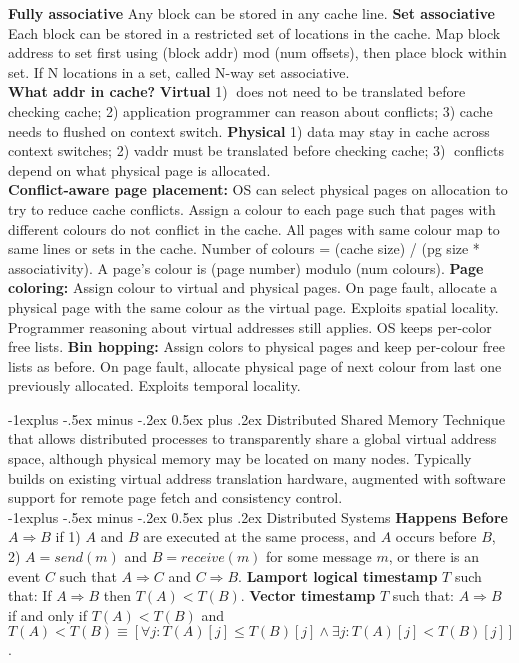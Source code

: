 \documentclass[9pt,landscape]{article}
\makeatletter
\renewcommand{\subsection}{\@startsection{subsection}{2}{0mm}%
                                {-1explus -.5ex minus -.2ex}%
                                {0.5ex plus .2ex}%
                                {\normalfont\normalsize\bfseries}}
\makeatother
\begin{document}
\begin{multicols}{3}
{\bf Fully associative} Any block can be stored in any cache line.
{\bf Set associative} Each block can be stored in a restricted set of locations in the cache.
Map block address to set first using (block addr) mod (num offsets), then place block within set. If N locations in a set, called N-way set associative.\\
{\bf What addr in cache?} {\bf Virtual} 1) 􏱃does not need to be translated before checking cache; 2) application programmer can reason about conflicts; 3) cache needs to flushed on context switch. {\bf Physical} 1) data may stay in cache across context switches; 2) vaddr must be translated before checking cache; 3) 􏱄conflicts depend on what physical page is allocated.\\
{\bf Conflict-aware page placement:} OS can select physical pages on allocation to try to reduce cache conflicts. Assign a colour to each page such that pages with different colours do not conflict in the cache. All pages with same colour map to same lines or sets in the cache. Number of colours = (cache size) / (pg size * associativity). A page's colour is (page number) modulo (num colours).
{\bf Page coloring:} Assign colour to virtual and physical pages. On page fault, allocate a physical page with the same colour as the virtual page. Exploits spatial locality. Programmer reasoning about virtual addresses still applies. OS keeps per-color free lists.
{\bf Bin hopping:} Assign colors to physical pages and keep per-colour free lists as before. On page fault, allocate physical page of next colour from last one previously allocated. Exploits temporal locality.

\subsection{Distributed Shared Memory}
Technique that allows distributed processes to transparently 
share a global virtual address space, although physical memory may be located on many nodes. 
Typically builds on existing virtual address translation hardware, 
augmented with software support for remote page fetch and consistency control.\\

\subsection{Distributed Systems}
{\bf Happens Before} $A \Rightarrow B$ if 
1) $A$ and $B$ are executed at the same process, and $A$
occurs before $B$, 
2) $A = send(m)$ and $B = receive(m)$ for some message $m$, or there is an event $C$ such that $A \Rightarrow C$ and $C \Rightarrow B$. 
{\bf Lamport logical timestamp} $T$ such that: If $A \Rightarrow B$ then $T(A) < T(B)$.
{\bf Vector timestamp} $T$ such that: $A \Rightarrow B$ if and only if $T(A) < T(B)$ and $T(A) < T(B) \equiv [\forall j: T(A)[j] \le T(B)[j] \wedge \exists j: T(A)[j] < T(B)[j]]$.\\


\end{multicols}
\end{document}
